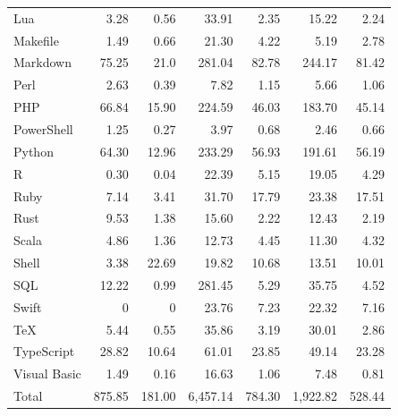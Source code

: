 \documentclass[10pt]{article} %
\begin{document}
\begin{table}[ht]
\begin{tabular}{l|rr|rr|rr}
	Lua          & 3.28   & 0.56  & 33.91   & 2.35   & 15.22   & 2.24   \\
	Makefile     & 1.49   & 0.66  & 21.30   & 4.22   & 5.19    & 2.78   \\
	Markdown     & 75.25  & 21.0  & 281.04  & 82.78  & 244.17  & 81.42  \\
	Perl         & 2.63   & 0.39  & 7.82    & 1.15   & 5.66    & 1.06   \\
	PHP          & 66.84  & 15.90 & 224.59  & 46.03  & 183.70  & 45.14  \\
	PowerShell   & 1.25   & 0.27  & 3.97    & 0.68   & 2.46    & 0.66   \\
	Python       & 64.30  & 12.96 & 233.29  & 56.93  & 191.61  & 56.19  \\
	R            & 0.30   & 0.04  & 22.39   & 5.15   & 19.05   & 4.29   \\
	Ruby         & 7.14   & 3.41  & 31.70   & 17.79  & 23.38   & 17.51  \\
	Rust         & 9.53   & 1.38  & 15.60   & 2.22   & 12.43   & 2.19   \\
	Scala        & 4.86   & 1.36  & 12.73   & 4.45   & 11.30   & 4.32   \\
	Shell        & 3.38   & 22.69 & 19.82   & 10.68  & 13.51   & 10.01  \\
	SQL          & 12.22  & 0.99  & 281.45  & 5.29   & 35.75   & 4.52   \\
	Swift        & 0      & 0     & 23.76   & 7.23   & 22.32   & 7.16   \\
	TeX          & 5.44   & 0.55  & 35.86   & 3.19   & 30.01   & 2.86   \\
	TypeScript   & 28.82  & 10.64 & 61.01   & 23.85  & 49.14   & 23.28  \\
	Visual Basic & 1.49   & 0.16  & 16.63   & 1.06   & 7.48    & 0.81   \\	
	\midrule 
	Total        & 875.85 & 181.00 & 6,457.14& 784.30 & 1,922.82 & 528.44 \\
	\bottomrule
\end{tabular}
\end{table}
\end{document}
